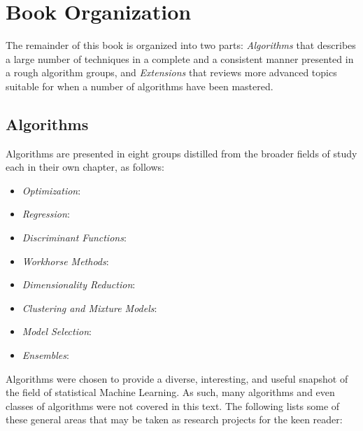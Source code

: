 
\section{Book Organization} 
\label{intro:organization}
The remainder of this book is organized into two parts: \emph{Algorithms} that describes a large number of techniques in a complete and a consistent manner presented in a rough algorithm groups, and \emph{Extensions} that reviews more advanced topics suitable for when a number of algorithms have been mastered.

% 
%
\subsection{Algorithms}
Algorithms are presented in eight groups distilled from the broader fields of study each in their own chapter, as follows: 

\begin{itemize}
	\item \emph{Optimization}:
	\item \emph{Regression}:
	\item \emph{Discriminant Functions}:	
	\item \emph{Workhorse Methods}:
	\item \emph{Dimensionality Reduction}:
	\item \emph{Clustering and Mixture Models}:
	\item \emph{Model Selection}:
	\item \emph{Ensembles}:	
\end{itemize}

Algorithms were chosen to provide a diverse, interesting, and useful snapshot of the field of statistical Machine  Learning. As such, many algorithms and even classes of algorithms were not covered in this text. The following lists some of these general areas that may be taken as research projects for the keen reader:


